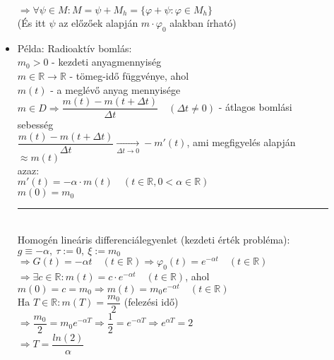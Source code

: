 \documentclass[margin=0px]{article}
\newcommand{\R}{\mathbb{R}}
\begin{document}
\begin{description}
\begin{itemize}
                  $\Rightarrow \forall \psi \in M : M = \psi + M_h = \{\varphi + \psi : \varphi \in M_h\}$\\
                  (És itt $\psi$ az előzőek alapján $m\cdot\varphi_0$ alakban írható)
            \item Példa: Radioaktív bomlás: \\
                  $ m_0 > 0$ - kezdeti anyagmennyiség \\
                  $ m \in \R \rightarrow \R $ - tömeg-idő függvénye, ahol \\
                  $m(t)$ - a meglévő anyag mennyisége \\
                  $ m \in D \Rightarrow \dfrac{m(t) - m(t+\Delta t)}{\Delta t} \quad (\Delta t \neq 0) $ - átlagos bomlási sebesség \\
                  $ \dfrac{m(t) - m(t+\Delta t)}{\Delta t} \xrightarrow[\Delta t \rightarrow 0]{} -m'(t) $, ami megfigyelés alapján $ \approx m(t)$ \\

                  azaz: \\
                  $ m'(t) = - \alpha \cdot m(t) \quad (t\in\R, 0 < \alpha \in \R)$\\
                  $ m(0) = m_0 $ \\
                  \rule{3cm}{0.2pt} \\
                  Homogén lineáris differenciálegyenlet (kezdeti érték probléma): \\
                  $ g \equiv -\alpha, \ \tau :=0, \ \xi := m_0 $ \\
                  $ \Rightarrow G(t) = -\alpha t \quad (t\in\R) \Rightarrow \varphi_0(t) = e^{-\alpha t} \quad (t \in \R)$ \\
                  $ \Rightarrow \exists c \in \R : m(t) = c\cdot e^{-\alpha t} \quad (t \in \R)$, ahol \\
                  $m(0) = c = m_0 \Longrightarrow m(t) = m_0e^{-\alpha t} \quad (t \in \R)$ \\
                  Ha $ T \in \R : m(T) = \dfrac{m_0}{2} $ (felezési idő) \\
                  $\Rightarrow \dfrac{m_0}{2} = m_0e^{-\alpha T} \Rightarrow \dfrac{1}{2} = e^{-\alpha T} \Rightarrow e^{\alpha T} = 2$ \\
                  $\Rightarrow T = \dfrac{ln(2)}{\alpha} $
        \end{itemize}
\end{description}
\end{document}
